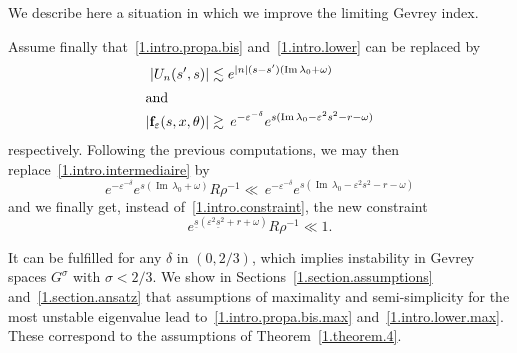\documentclass[AHL,Unicode,longabstracts,published]{cedram}
\theoremstyle{plain}
\newcommand*\e{\varepsilon}
\newcommand*\f{{\mathbf f}}
\newcommand*\und{\underline}
\DeclareMathOperator{\Imm}{Im}
\begin{document}
We describe here a situation in which we improve the limiting Gevrey index.

Assume finally that~\eqref{1.intro.propa.bis} and~\eqref{1.intro.lower} can be replaced by
\begin{align}\left|U_n(s',s)\right| &\lesssim e^{|n|(s-s') ({\Imm}\,\lambda_0 + \omega)}\label{1.intro.propa.bis.max}
\\
\intertext{and}
|\f_{\e}(s,x,\theta)| &\gtrsim \,e^{-\e^{-\delta}} e^{s({\Imm}\,\lambda_0 - \e^2 s^2- r - \omega)}\label{1.intro.lower.max}
\end{align}
respectively. Following the previous computations, we may then replace~\eqref{1.intro.intermediaire} by
\[
e^{-\e^{-\delta}} e^{s ({\Imm}\,\lambda_0 + \omega)} R\rho^{-1} \ll \,e^{-\e^{-\delta}} e^{s({\Imm}\,\lambda_0 - \e^2 s^2 - r - \omega)}
\]
and we finally get, instead of~\eqref{1.intro.constraint}, the new constraint
\[
e^{\und{s}(\e^2 \und{s}^2 + r + \omega)} R\rho^{-1} \ll 1.
\]


It can be fulfilled for any $\delta$ in $(0,2/3)$, which implies instability in Gevrey spaces $G^{\sigma}$ with $\sigma < 2/3$. We show in Sections~\ref{1.section.assumptions} and~\ref{1.section.ansatz} that assumptions of maximality and semi-simplicity for the most unstable eigenvalue lead to~\eqref{1.intro.propa.bis.max} and~\eqref{1.intro.lower.max}. These correspond to the assumptions of Theorem~\ref{1.theorem.4}.
\end{document}
